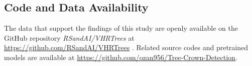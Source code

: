 \documentclass{article}
\begin{document}
\subsection*{Code and Data Availability}

The data that support the findings of this study are openly available on the GitHub repository \textit{RSandAI/VHRTrees} at \url{https://github.com/RSandAI/VHRTrees} \cite{10.3389/ffgc.2024.1495544}. Related source codes and pretrained models are available at \url{https://github.com/ozan956/Tree-Crown-Detection}.




  
  
\end{document}
